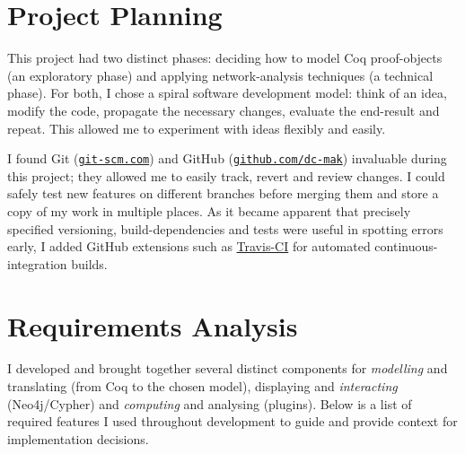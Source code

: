 \section{Project Planning}

This project had two distinct phases: deciding how to model Coq proof-objects
(an exploratory phase) and applying network-analysis techniques (a technical
phase). For both, I chose a spiral software development model: think of an idea,
modify the code, propagate the necessary changes, evaluate the end-result and
repeat. This allowed me to experiment with ideas flexibly and easily.

I found Git (\href{http://git-scm.com}{\texttt{git-scm.com}}) and GitHub
(\href{http://github.com/dc-mak}{\texttt{github.com/dc-mak}}) invaluable during
this project; they allowed me to easily track, revert and review changes. I could
safely test new features on different branches before merging them and store
a copy of my work in multiple places. As it became apparent that precisely
specified versioning, build-dependencies and tests were useful in spotting
errors early, I added GitHub extensions such as
\href{https://travis-ci.org}{Travis-CI} for automated continuous-integration
builds.

\section{Requirements Analysis}

I developed and brought together several distinct components for
\emph{modelling} and translating (from Coq to the chosen model), displaying and
\emph{interacting} (Neo4j/Cypher) and \emph{computing} and analysing (plugins).
Below is a list of required features I used throughout development to guide and
provide context for implementation decisions.

